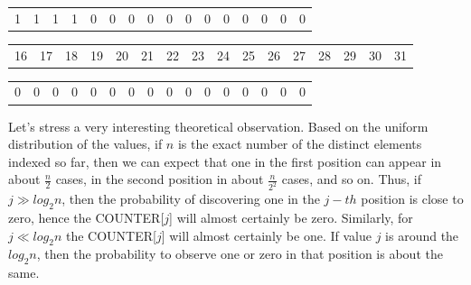 \documentclass[a4paper,13pt]{article}
\theoremstyle{mytheor}
\begin{document}
\begin{mdframed}
\begin{center}
\begin{tabular}{|p{0.4cm}|p{0.4cm}|p{0.4cm}|p{0.4cm}|p{0.4cm}|p{0.4cm}|p{0.4cm}|p{0.4cm}|p{0.4cm}|p{0.4cm}|p{0.4cm}|p{0.4cm}|p{0.4cm}|p{0.4cm}|p{0.4cm}|p{0.4cm}|}
            \hline
            1 & 1 & 1 & 1 & 0 & 0 & 0 & 0 & 0 & 0 & 0 & 0 & 0 & 0 & 0 & 0 \\ \cline{1-16} %
        \end{tabular}
        \begin{tabular}{p{0.4cm}p{0.4cm}p{0.4cm}p{0.4cm}p{0.4cm}p{0.4cm}p{0.4cm}p{0.4cm}p{0.4cm}p{0.4cm}p{0.4cm}p{0.4cm}p{0.4cm}p{0.4cm}p{0.4cm}p{0.4cm}}
            16 & 17 & 18 & 19 & 20 & 21 & 22 & 23 & 24 & 25 & 26 & 27 & 28 & 29 & 30 & 31 %
        \end{tabular}
        \begin{tabular}{|p{0.4cm}|p{0.4cm}|p{0.4cm}|p{0.4cm}|p{0.4cm}|p{0.4cm}|p{0.4cm}|p{0.4cm}|p{0.4cm}|p{0.4cm}|p{0.4cm}|p{0.4cm}|p{0.4cm}|p{0.4cm}|p{0.4cm}|p{0.4cm}|}
            \hline
            0 & 0 & 0 & 0 & 0 & 0 & 0 & 0 & 0 & 0 & 0 & 0 & 0 & 0 & 0 & 0 \\ \cline{1-16} %
        \end{tabular}
    \end{center}
\end{mdframed}

Let's stress a very interesting theoretical observation. Based on
the uniform distribution of the values, if $n$ is the exact number of the distinct elements
indexed so far, then we can expect that one in the first position can appear in about
$\frac{n}{2}$ cases, in the second position in about $\frac{n}{2^2}$ cases, and so on. Thus,
if $j\gg log_2n$, then the probability of
discovering one in the $j-th$ position is close to zero, hence
the COUNTER[$j$] will almost certainly be zero. Similarly, for $j\ll log_2n$
the COUNTER[$j$] will almost certainly be one. If value $j$ is around
the $log_2n$, then the probability to observe one or zero in that position is
about the same.
\end{document}
